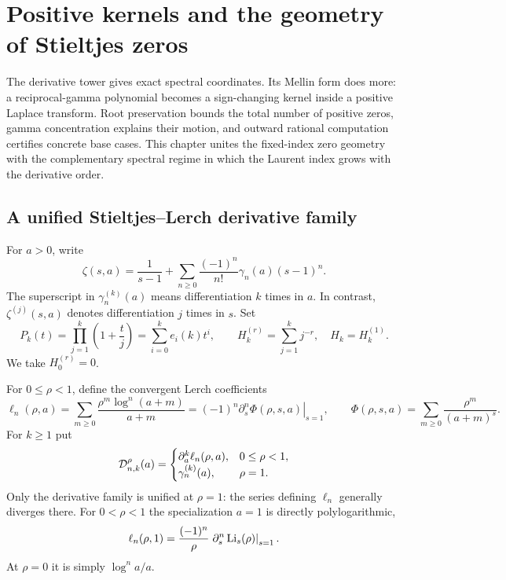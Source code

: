 \chapter{Positive kernels and the geometry of Stieltjes zeros}\label{ch:zeros}
The derivative tower gives exact spectral coordinates. Its Mellin form
does more: a reciprocal-gamma polynomial becomes a sign-changing kernel
inside a positive Laplace transform. Root preservation bounds the total
number of positive zeros, gamma concentration explains their motion, and
outward rational computation certifies concrete base cases. This chapter
unites the fixed-index zero geometry with the complementary spectral
regime in which the Laurent index grows with the derivative order.

\section{A unified Stieltjes--Lerch derivative family}
\label{zeros:sec:family}

For $a>0$, write
\begin{equation}\label{zeros:eq:laurent}
 \zeta(s,a)=\frac1{s-1}+\sum_{n\geq0}\frac{(-1)^n}{n!}\gamma_n(a)(s-1)^n.
\end{equation}
The superscript in $\gamma_n^{(k)}(a)$ means differentiation $k$ times in $a$. In contrast, $\zeta^{(j)}(s,a)$ denotes differentiation $j$ times in $s$. Set
\begin{equation}\label{zeros:eq:Pk}
 P_k(t)=\prod_{j=1}^k\left(1+\frac tj\right)
       =\sum_{i=0}^k e_i(k)t^i,
 \qquad H_k^{(r)}=\sum_{j=1}^k j^{-r},\quad H_k=H_k^{(1)}.
\end{equation}
We take $H_0^{(r)}=0$.

For $0\leq\rho<1$, define the convergent Lerch coefficients
\begin{equation}\label{zeros:eq:lambda}
 \ell_n(\rho,a)=\sum_{m\geq0}\frac{\rho^m\log^n(a+m)}{a+m}
   =(-1)^n\left.\partial_s^n\Phi(\rho,s,a)\right|_{s=1},
 \qquad
 \Phi(\rho,s,a)=\sum_{m\geq0}\frac{\rho^m}{(a+m)^s}.
\end{equation}
For $k\geq1$ put
\begin{equation}\label{zeros:eq:Dfamily}
 \mathcal D_{n,k}^{\rho}(a)=
 \begin{cases}
 \partial_a^k\ell_n(\rho,a),&0\leq\rho<1,\\
 \gamma_n^{(k)}(a),&\rho=1.
 \end{cases}
\end{equation}
Only the derivative family is unified at $\rho=1$: the series defining $\ell_n$ generally diverges there. For $0<\rho<1$ the specialization $a=1$ is directly polylogarithmic,
\begin{equation}
 \ell_n(\rho,1)=\frac{(-1)^n}{\rho}
       \left.\partial_s^n\operatorname{Li}_s(\rho)\right|_{s=1}.
\end{equation}
At $\rho=0$ it is simply $\log^n a/a$.

